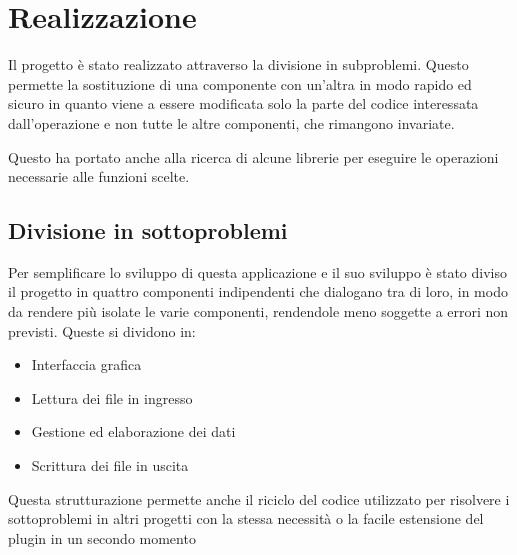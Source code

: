 
\chapter{Realizzazione}
\label{cap:realizzazione}

Il progetto è stato realizzato attraverso la divisione in subproblemi. Questo permette la sostituzione di una componente con un'altra in modo rapido ed sicuro in quanto viene a essere modificata solo la parte del codice interessata dall'operazione e non tutte le altre componenti, che rimangono invariate. 

Questo ha portato anche alla ricerca di alcune librerie per eseguire le operazioni necessarie alle funzioni scelte.

\section{Divisione in sottoproblemi}
Per semplificare lo sviluppo di questa applicazione e il suo sviluppo è stato diviso il progetto in quattro componenti indipendenti che dialogano tra di loro, in modo da rendere più isolate le varie componenti, rendendole meno soggette a errori non previsti. 
Queste si dividono in:
\begin{itemize}
\item Interfaccia grafica
\item Lettura dei file in ingresso
\item Gestione ed elaborazione dei dati
\item Scrittura dei file in uscita
\end{itemize}

Questa strutturazione permette anche il riciclo del codice utilizzato per risolvere i sottoproblemi in altri progetti con la stessa necessità o la facile estensione del plugin in un secondo momento

